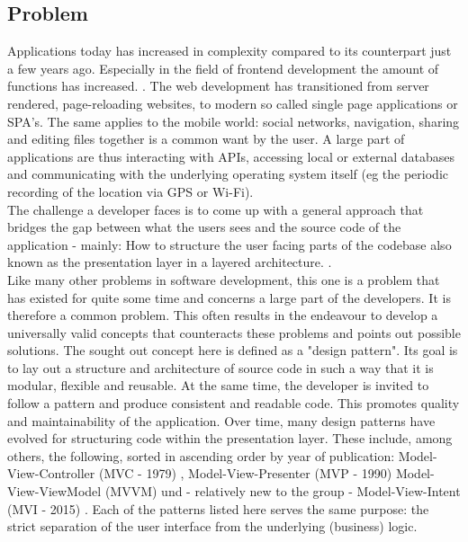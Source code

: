 \subsection{Problem}
\label{subsec:problem}

Applications today has increased in complexity compared to its counterpart just a few years ago. Especially in the field of frontend development the amount of 
functions has increased.
\cite{kevin2018}. 
The web development has transitioned from server rendered, 
page-reloading websites, to modern so called single page applications or SPA's.
The same applies to the mobile world: social networks, navigation, sharing and editing files together is a common want by the user.
A large part of applications are thus interacting with APIs, accessing local or external databases
and communicating with the underlying operating system itself (eg the periodic recording of the location via GPS or Wi-Fi).
\\
The challenge a developer faces is to come up with a general approach that bridges the gap between what the users sees and the source code of 
the application - mainly: How to structure the user facing parts of the codebase also known as the presentation layer in a layered architecture.
\cite{guru99ntier,softwareArchitecturePatternsMark2015}. 
\\
Like many other problems in software development, this one is a problem that has existed for quite some time and concerns a large part of the developers.
It is therefore a common problem. This often results in the endeavour to develop a universally valid concepts that counteracts these problems and points out 
possible solutions. The sought out concept here is defined as a "design pattern".
\cite{techterms2016design-pattern}
Its goal is to lay out a structure and architecture of source code in such a way that it is modular, flexible and
reusable. At the same time, the developer is invited to follow a pattern and produce consistent and readable code. This promotes quality and
maintainability of the application. Over time, many design patterns have evolved for structuring code within the presentation layer. 
These include, among others, the following, sorted in ascending order by year of publication: Model-View-Controller (MVC - 1979) 
\cite{wikipediaMvc}, 
Model-View-Presenter (MVP - 1990) 
\cite{wikipediaMvp} 
Model-View-ViewModel (MVVM) 
\cite{blogMsdnMvvm} und - relatively
new to the group - Model-View-Intent (MVI - 2015) 
\cite{youtubeAndreStaltzUserFunction}. 
Each of the patterns listed here serves the same purpose: the strict separation of the user interface from the underlying (business) logic.
